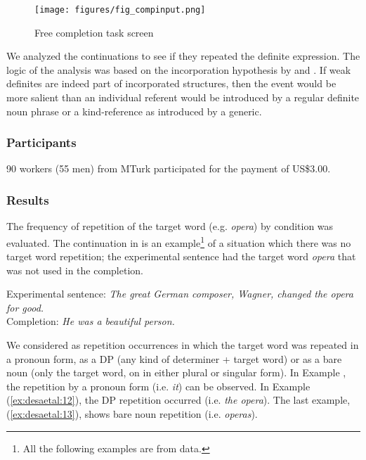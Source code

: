 \documentclass[output=paper,
modfonts
]{langscibook}
\begin{document}
\begin{figure}[H]
\centering
\texttt{[image: figures/fig\_compinput.png]}
\caption{Free completion task screen}
\label{fig:desaetal:8}
\end{figure}

We analyzed the continuations to see if they repeated the definite expression. The logic of the analysis was based on the incorporation hypothesis by \citet{CarlsonEtAlii2013} and \citet{KleinEtAlii2013}. If weak definites are indeed part of incorporated structures, then the event would be more salient than an individual referent would be introduced by a regular definite noun phrase or a kind-reference as introduced by a generic.

\subsubsection{Participants}
90 workers (55 men) from MTurk participated for the payment of US\$3.00. 

\subsubsection{Results}

The frequency of repetition of the target word (e.g. \textit{opera}) by condition was evaluated. The continuation in  is an example\footnote{All the following examples are from data.} of a situation which there was no target word repetition; the experimental sentence had the target word  \textit{opera} that was not used in the completion. 

\ea \label{ex:desaetal:10}
{Experimental sentence:} \textit{The great German composer, Wagner, changed the opera for good.}
\\ {Completion:} \textit{He was a beautiful person.}
\z

We considered as repetition occurrences in which the target word was repeated in a pronoun form, as a DP (any kind of determiner + target word) or as a bare noun (only the target word, on in either plural or singular form). In Example , the repetition by a pronoun form (i.e. \textit{it}) can be observed. In Example (\ref{ex:desaetal:12}), the DP repetition occurred (i.e. \textit{the opera}). The last example, (\ref{ex:desaetal:13}), shows bare noun repetition (i.e. \textit{operas}).
\end{document}

